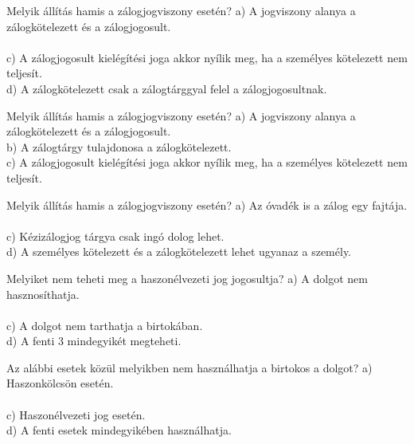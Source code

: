 \begin{frame}

\begin{tcolorbox}[title={125. Kérdés}]
Melyik állítás hamis a zálogjogviszony esetén?
\tcblower
a) A jogviszony alanya a zálogkötelezett és a zálogjogosult.\\
\\
c) A zálogjogosult kielégítési joga akkor nyílik meg, ha a személyes kötelezett nem teljesít. \\
d) A zálogkötelezett csak a zálogtárggyal felel a zálogjogosultnak. 
\end{tcolorbox}

\begin{tcolorbox}[title={126. Kérdés}]
Melyik állítás hamis a zálogjogviszony esetén?
\tcblower
a) A jogviszony alanya a zálogkötelezett és a zálogjogosult.\\
b) A zálogtárgy tulajdonosa a zálogkötelezett.\\
c) A zálogjogosult kielégítési joga akkor nyílik meg, ha a személyes kötelezett nem teljesít. \\
\end{tcolorbox}

\begin{tcolorbox}[title={127. Kérdés}]
Melyik állítás hamis a zálogjogviszony esetén?
\tcblower
a) Az óvadék is a zálog egy fajtája.\\
\\
c) Kézizálogjog tárgya csak ingó dolog lehet.\\
d) A személyes kötelezett és a zálogkötelezett lehet ugyanaz a személy.
\end{tcolorbox}

\end{frame}


\begin{frame}

\begin{tcolorbox}[title={128. Kérdés}]
Melyiket nem teheti meg a haszonélvezeti jog jogosultja?
\tcblower
a) A dolgot nem hasznosíthatja.\\
\\
c) A dolgot nem tarthatja a birtokában.\\
d) A fenti 3 mindegyikét megteheti.
\end{tcolorbox}

\begin{tcolorbox}[title={129. Kérdés}]
Az alábbi esetek közül melyikben nem használhatja a birtokos a dolgot?
\tcblower
a) Haszonkölcsön esetén.\\
\\
c) Haszonélvezeti jog esetén.\\
d) A fenti esetek mindegyikében használhatja.
\end{tcolorbox}

\end{frame}

